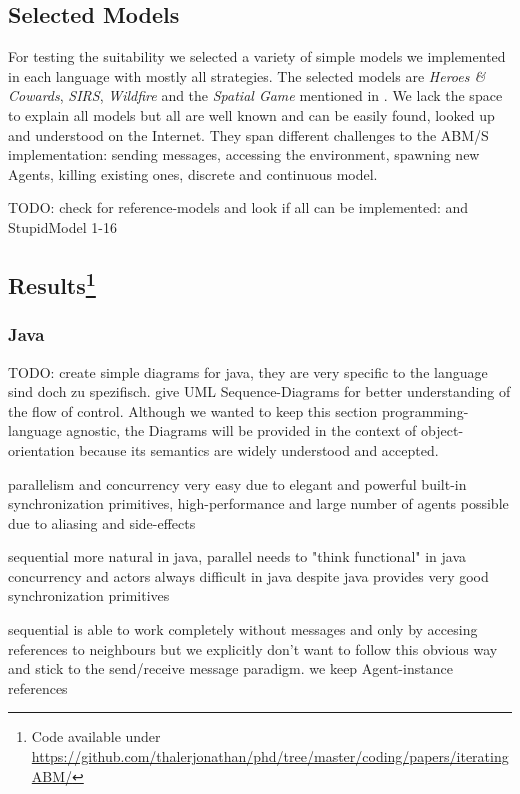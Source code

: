 \subsection{Selected Models}
For testing the suitability we selected a variety of simple models we implemented in each language with mostly all strategies. The selected models are \textit{Heroes \& Cowards}, \textit{SIRS}, \textit{Wildfire} and the \textit{Spatial Game} mentioned in \cite{huberman_evolutionary_1993}. We lack the space to explain all models but all are well known and can be easily found, looked up and understood on the Internet. They span different challenges to the ABM/S implementation: sending messages, accessing the environment, spawning new Agents, killing existing ones, discrete and continuous model.

TODO: check for reference-models and look if all can be implemented: \cite{isaac_abm_2011} and StupidModel 1-16

\subsection[Results]{Results\footnote{Code available under\\ \url{https://github.com/thalerjonathan/phd/tree/master/coding/papers/iteratingABM/}}}

\subsubsection{Java}
TODO: create simple diagrams for java, they are very specific to the language sind doch zu spezifisch.
 give UML Sequence-Diagrams for better understanding of the flow of control. Although we wanted to keep this section programming-language agnostic, the Diagrams will be provided in the context of object-orientation because its semantics are widely understood and accepted.

parallelism and concurrency very easy due to elegant and powerful built-in synchronization primitives, high-performance and large number of agents possible due to aliasing and side-effects

sequential more natural in java,
parallel needs to "think functional" in java
concurrency and actors always difficult in java despite java provides very good synchronization primitives

sequential is able to work completely without messages and only by accesing references to neighbours but we explicitly don't want to follow this obvious way and stick to the send/receive message paradigm. we keep Agent-instance references


